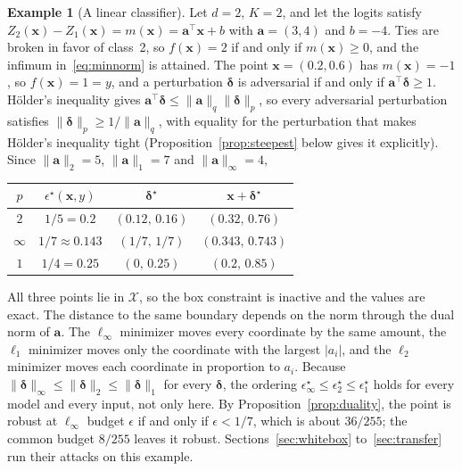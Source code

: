 \documentclass[10pt,a4paper]{extarticle}
\theoremstyle{definition}
\newtheorem{example}{Example}[section]
\newcommand{\X}{\mathcal{X}}
\newcommand{\x}{\mathbf{x}}
\newcommand{\bdelta}{\boldsymbol{\delta}}
\begin{document}
\begin{example}[A linear classifier]\label{exm:linear}
Let \(d=2\), \(K=2\), and let the logits satisfy \(Z_2(\x)-Z_1(\x)=m(\x)=\mathbf{a}^\top\x+b\) with \(\mathbf{a}=(3,4)\) and \(b=-4\). Ties are broken in favor of class~2, so \(f(\x)=2\) if and only if \(m(\x)\ge0\), and the infimum in~\eqref{eq:minnorm} is attained. The point \(\x=(0.2,0.6)\) has \(m(\x)=-1\), so \(f(\x)=1=y\), and a perturbation \(\bdelta\) is adversarial if and only if \(\mathbf{a}^\top\bdelta\ge1\). Hölder's inequality gives \(\mathbf{a}^\top\bdelta\le\|\mathbf{a}\|_q\|\bdelta\|_p\), so every adversarial perturbation satisfies \(\|\bdelta\|_p\ge1/\|\mathbf{a}\|_q\), with equality for the perturbation that makes Hölder's inequality tight (Proposition~\ref{prop:steepest} below gives it explicitly). Since \(\|\mathbf{a}\|_2=5\), \(\|\mathbf{a}\|_1=7\) and \(\|\mathbf{a}\|_\infty=4\),
\begin{center}
\small
\begin{tabular}{@{}cccc@{}}
\toprule
\(p\) & \(\epsilon^\star(\x,y)\) & \(\bdelta^\star\) & \(\x+\bdelta^\star\) \\
\midrule
\(2\) & \(1/5=0.2\) & \((0.12,\,0.16)\) & \((0.32,\,0.76)\) \\
\(\infty\) & \(1/7\approx0.143\) & \((1/7,\,1/7)\) & \((0.343,\,0.743)\) \\
\(1\) & \(1/4=0.25\) & \((0,\,0.25)\) & \((0.2,\,0.85)\) \\
\bottomrule
\end{tabular}
\end{center}
All three points lie in \(\X\), so the box constraint is inactive and the values are exact. The distance to the same boundary depends on the norm through the dual norm of \(\mathbf{a}\). The \(\ell_\infty\) minimizer moves every coordinate by the same amount, the \(\ell_1\) minimizer moves only the coordinate with the largest \(|a_i|\), and the \(\ell_2\) minimizer moves each coordinate in proportion to \(a_i\). Because \(\|\bdelta\|_\infty\le\|\bdelta\|_2\le\|\bdelta\|_1\) for every \(\bdelta\), the ordering \(\epsilon^\star_\infty\le\epsilon^\star_2\le\epsilon^\star_1\) holds for every model and every input, not only here. By Proposition~\ref{prop:duality}, the point is robust at \(\ell_\infty\) budget \(\epsilon\) if and only if \(\epsilon<1/7\), which is about \(36/255\); the common budget \(8/255\) leaves it robust. Sections~\ref{sec:whitebox} to~\ref{sec:transfer} run their attacks on this example.
\end{example}
\end{document}
